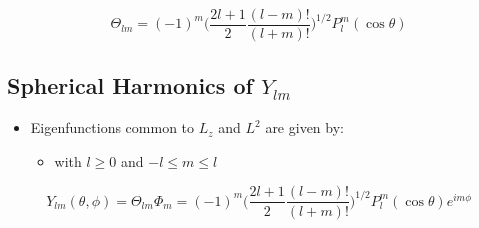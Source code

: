 \documentclass[a4paper,11pt,normalem]{article}
\begin{document}
\[
    \Theta_{lm} = (-1)^m \Big(\frac{2l + 1}{2} \frac{(l - m)!}{(l + m)!} \Big)^{1/2} P_{l}^{m}(\cos\theta)
\]

\subsection{\texorpdfstring{Spherical Harmonics of
\(Y_{lm}\)}{Spherical Harmonics of Y\_\{lm\}}}\label{spherical-harmonics-of-y_lm}

\begin{itemize}
\item
  Eigenfunctions common to \(L_z\) and \(L^2\) are given by:
  \begin{itemize}
  \item
    with \(l \geq 0\) and \(-l \leq m \leq l\)
  \end{itemize}
\end{itemize}

\[
    Y_{lm}(\theta, \phi) = \Theta_{lm}\Phi_m = (-1)^m \Big(\frac{2l + 1}{2} \frac{(l - m)!}{(l + m)!} \Big)^{1/2} P_{l}^{m}(\cos\theta)e^{im\phi}
\]
\end{document}
